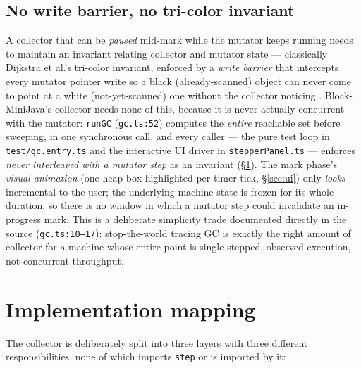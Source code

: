 \documentclass[11pt]{article}
\begin{document}
\subsection{No write barrier, no tri-color invariant}
\label{sec:no-write-barrier}

A collector that can be \emph{paused} mid-mark while the mutator keeps
running needs to maintain an invariant relating collector and mutator
state --- classically Dijkstra et al.'s tri-color invariant, enforced by a
\emph{write barrier} that intercepts every mutator pointer write so a
black (already-scanned) object can never come to point at a white
(not-yet-scanned) one without the collector noticing
\cite{dijkstra1978line}. Block-MiniJava's collector needs none of this,
because it is never actually concurrent with the mutator: \texttt{runGC}
(\texttt{gc.ts:52}) computes the \emph{entire} reachable set before
sweeping, in one synchronous call, and every caller --- the pure test loop
in \texttt{test/gc.entry.ts} and the interactive UI driver in
\texttt{stepperPanel.ts} --- enforces \emph{never interleaved with a
mutator step} as an invariant (\S\ref{sec:impl}). The mark phase's
\emph{visual animation} (one heap box highlighted per timer tick,
\S\ref{sec:ui}) only \emph{looks} incremental to the user; the underlying
machine state is frozen for its whole duration, so there is no window in
which a mutator step could invalidate an in-progress mark. This is a
deliberate simplicity trade documented directly in the source
(\texttt{gc.ts:10--17}): stop-the-world tracing GC is exactly the right
amount of collector for a machine whose entire point is single-stepped,
observed execution, not concurrent throughput.

\section{Implementation mapping}
\label{sec:impl}

The collector is deliberately split into three layers with three different
responsibilities, none of which imports \texttt{step} or is imported by it:
\end{document}
